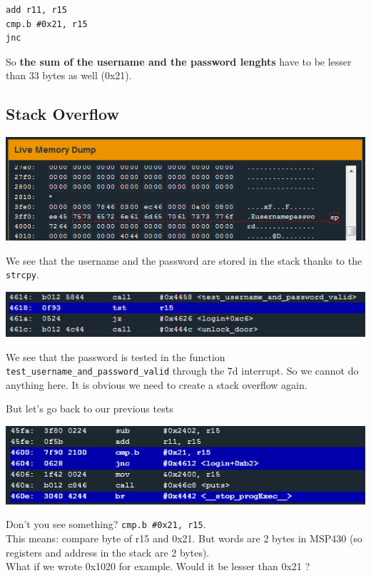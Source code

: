 \documentclass[a4paper,11pt]{article}
\begin{document}
\begin{verbatim}
add r11, r15
cmp.b #0x21, r15
jnc
\end{verbatim}

So \textbf{the sum of the username and the password lenghts} have to be
lesser than 33 bytes as well (0x21).

\subsection{Stack Overflow}\label{stack-overflow-1}

\includegraphics{img/11_3.PNG}

We see that the username and the password are stored in the stack thanks
to the \texttt{strcpy}.

\includegraphics{img/11_4.PNG}

We see that the password is tested in the function
\texttt{test\_username\_and\_password\_valid} through the 7d interrupt.
So we cannot do anything here. It is obvious we need to create a stack
overflow again.

But let's go back to our previous tests

\includegraphics{img/11_2.PNG}

Don't you see something? \texttt{cmp.b \#0x21, r15}.\\This means:
compare byte of r15 and 0x21. But words are 2 bytes in MSP430 (so
registers and address in the stack are 2 bytes).\\What if we wrote
0x1020 for example. Would it be lesser than 0x21 ?
\end{document}
